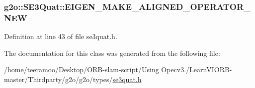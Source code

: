 \subsubsection[{\texorpdfstring{E\+I\+G\+E\+N\+\_\+\+M\+A\+K\+E\+\_\+\+A\+L\+I\+G\+N\+E\+D\+\_\+\+O\+P\+E\+R\+A\+T\+O\+R\+\_\+\+N\+EW}{EIGEN_MAKE_ALIGNED_OPERATOR_NEW}}]{\setlength{\rightskip}{0pt plus 5cm}g2o\+::\+S\+E3\+Quat\+::\+E\+I\+G\+E\+N\+\_\+\+M\+A\+K\+E\+\_\+\+A\+L\+I\+G\+N\+E\+D\+\_\+\+O\+P\+E\+R\+A\+T\+O\+R\+\_\+\+N\+EW}\hypertarget{classg2o_1_1SE3Quat_a5bcd64993957b1a87a113d9a282d4fcb}{}\label{classg2o_1_1SE3Quat_a5bcd64993957b1a87a113d9a282d4fcb}


Definition at line 43 of file se3quat.\+h.



The documentation for this class was generated from the following file\+:\begin{DoxyCompactItemize}
\item 
/home/teeramoo/\+Desktop/\+O\+R\+B-\/slam-\/script/\+Using Opecv3./\+Learn\+V\+I\+O\+R\+B-\/master/\+Thirdparty/g2o/g2o/types/\hyperlink{se3quat_8h}{se3quat.\+h}\end{DoxyCompactItemize}
